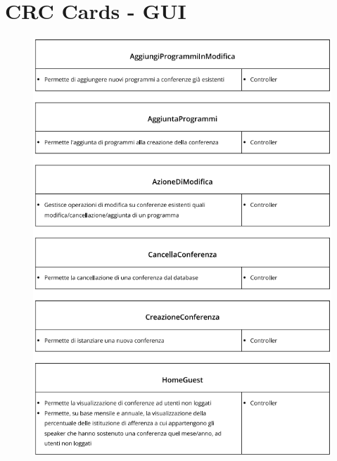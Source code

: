 \documentclass[a4paper,italian,10pt,openany]{book}
\begin{document}
\section{CRC Cards - GUI}
\begin{figure}[h!]
\centering
\includegraphics[width=15cm]{crc_card_gui1}
\end{figure}
\end{document}
